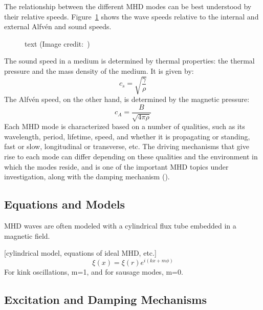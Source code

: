 \documentclass[preprint2]{aastex}
\begin{document}
The relationship between the different MHD modes can be best understood
by their relative speeds. Figure~\ref{speeds} shows the wave speeds relative
to the internal and external Alfv\'en and sound speeds.

\begin{figure}[ht]
    \caption{text (Image credit:~\cite{Nak})}
    \label{speeds}
\end{figure}

The sound speed in a medium is determined by thermal properties:
the thermal pressure and the mass density of the medium.
It is given by:
\begin{equation}\label{sound_speed}
    c_s = \sqrt{\frac{\gamma }{\rho}}
\end{equation}
The Alfv\'en speed, on the other hand, is determined by the magnetic
pressure:
\begin{equation}\label{Alfven_speed}
    c_A = \frac{B}{\sqrt{4\pi\rho}}
\end{equation}
Each MHD mode is characterized based on a number of qualities, such
as its wavelength, period, lifetime, speed, and
whether it is propagating or standing, fast or slow, longitudinal
or transverse, etc. The driving mechanisms that give rise to each mode
can differ depending on these qualities and the environment in which
the modes reside, and is one of the important MHD topics under investigation,
along with the damping mechanism (\cite{kink_1}).

\subsection{Equations and Models}
MHD waves are often modeled with a cylindrical flux tube embedded
in a magnetic field.

[cylindrical model, equations of ideal MHD, etc.]
\begin{equation}
 \xi(x) = \xi(r)e^{i(kx+m\phi)}
\end{equation}
For kink oscillations, m=1, and for sausage modes, m=0.

\subsection{Excitation and Damping Mechanisms}
\end{document}
